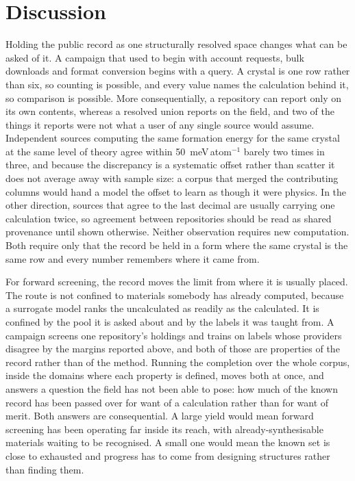\section{Discussion}

Holding the public record as one structurally resolved space changes what can be
asked of it. A campaign that used to begin with account requests, bulk downloads
and format conversion begins with a query. A crystal is one row rather than six,
so counting is possible, and every value names the calculation behind it, so
comparison is possible. More consequentially, a repository can report only on its
own contents, whereas a resolved union reports on the field, and two of the things
it reports were not what a user of any single source would assume. Independent
sources computing the same formation energy for the same crystal at the same
level of theory agree within 50~meV\,atom$^{-1}$ barely two times in three, and
because the discrepancy is a
systematic offset rather than scatter it does not average away with sample size:
a corpus that merged the contributing columns would hand a model the offset to
learn as though it were physics. In the other direction, sources that agree to
the last decimal are usually carrying one calculation twice, so agreement between
repositories should be read as shared provenance until shown otherwise. Neither
observation requires new computation. Both require only that the record be held
in a form where the same crystal is the same row and every number remembers where
it came from.

For forward screening, the record moves the limit from where it is usually
placed. The route is not confined to materials somebody has already computed,
because a surrogate model ranks the uncalculated as readily as the calculated.
It is confined by the pool it is asked about and by the labels it was taught
from. A campaign screens one repository's holdings and trains on labels whose
providers disagree by the margins reported above, and both of those are
properties of the record rather than of the method. Running the completion over
the whole corpus, inside the domains where each property is defined, moves both
at once, and answers a question the field has not been able to pose: how much of
the known record has been passed over for want of a calculation rather than for
want of merit. Both answers are consequential. A large yield would mean forward
screening has been operating far inside its reach, with already-synthesisable
materials waiting to be recognised. A small one would mean the known set is close
to exhausted and progress has to come from designing structures rather than
finding them.

